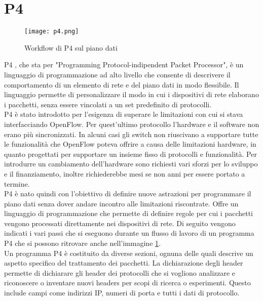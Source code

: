\section{P4}
\begin{figure}[h]
    \centering
   \texttt{[image: p4.png]}
    \caption{Workflow di P4 sul piano dati}
    \label{fig:p4}
\end{figure}
P4 \cite{p4}, che sta per "Programming Protocol-indipendent Packet Processor",  è un linguaggio di programmazione ad alto livello che consente di descrivere il comportamento di un elemento di rete e del piano dati in modo flessibile.
Il linguaggio permette di personalizzare il modo in cui i dispositivi di rete elaborano i pacchetti, senza essere vincolati a un set predefinito di protocolli.
\\P4 è stato introdotto per l'esigenza di superare le limitazioni con cui si stava interfacciando OpenFlow.
Per quest'ultimo protocollo l'hardware e il software non erano più sincronizzati. In alcuni casi 
gli switch non riuscivano a supportare tutte le funzionalità che OpenFlow poteva offrire a causa delle limitazioni hardware, in quanto progettati per supportare un insieme fisso di protocolli e funzionalità. 
Per introdurre un cambiamento dell'hardware sono richiesti vari sforzi per lo sviluppo e il finanziamento, inoltre richiederebbe mesi se non anni per essere portato a termine.
\\P4 è nato quindi con l'obiettivo di definire nuove astrazioni per programmare il piano dati senza dover andare incontro alle limitazioni riscontrate.
Offre un linguaggio di programmazione che permette di definire regole per cui i pacchetti vengono processati direttamente nei dispositivi di rete.
Di seguito vengono indicati i vari passi che si eseguono durante un flusso di lavoro di un programma P4 che si possono ritrovare anche nell'immagine \ref{fig:p4}.
\\Un programma P4 è costituito da diverse sezioni, ognuna delle quali descrive un aspetto specifico del trattamento dei pacchetti.
La dichiarazione degli header permette di dichiarare gli header dei protocolli che si vogliono analizzare e riconoscere o inventare nuovi headers per scopi di ricerca o esperimenti.
Questo include campi come indirizzi IP, numeri di porta e tutti i dati di protocollo.
